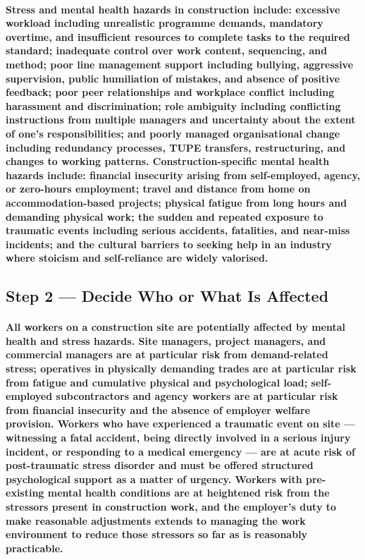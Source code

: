 \paragraph{Stress and mental health hazards in construction include: excessive workload including unrealistic programme demands, mandatory overtime, and insufficient resources to complete tasks to the required standard; inadequate control over work content, sequencing, and method; poor line management support including bullying, aggressive supervision, public humiliation of mistakes, and absence of positive feedback; poor peer relationships and workplace conflict including harassment and discrimination; role ambiguity including conflicting instructions from multiple managers and uncertainty about the extent of one's responsibilities; and poorly managed organisational change including redundancy processes, TUPE transfers, restructuring, and changes to working patterns. Construction-specific mental health hazards include: financial insecurity arising from self-employed, agency, or zero-hours employment; travel and distance from home on accommodation-based projects; physical fatigue from long hours and demanding physical work; the sudden and repeated exposure to traumatic events including serious accidents, fatalities, and near-miss incidents; and the cultural barriers to seeking help in an industry where stoicism and self-reliance are widely valorised.}

\subsection{Step 2 --- Decide Who or What Is Affected}
\paragraph{All workers on a construction site are potentially affected by mental health and stress hazards. Site managers, project managers, and commercial managers are at particular risk from demand-related stress; operatives in physically demanding trades are at particular risk from fatigue and cumulative physical and psychological load; self-employed subcontractors and agency workers are at particular risk from financial insecurity and the absence of employer welfare provision. Workers who have experienced a traumatic event on site --- witnessing a fatal accident, being directly involved in a serious injury incident, or responding to a medical emergency --- are at acute risk of post-traumatic stress disorder and must be offered structured psychological support as a matter of urgency. Workers with pre-existing mental health conditions are at heightened risk from the stressors present in construction work, and the employer's duty to make reasonable adjustments extends to managing the work environment to reduce those stressors so far as is reasonably practicable.}

